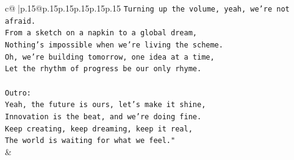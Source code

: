 \documentclass{article}
\begin{document}
{\begin{supertabular}{c@{$\;$}|p{.15\linewidth}@{}p{.15\linewidth}p{.15\linewidth}p{.15\linewidth}p{.15\linewidth}p{.15\linewidth}}
{{{\texttt{Turning up the volume, yeah, we're not afraid.} \\
\texttt{From a sketch on a napkin to a global dream,} \\
\texttt{Nothing's impossible when we're living the scheme.} \\
\texttt{Oh, we're building tomorrow, one idea at a time,} \\
\texttt{Let the rhythm of progress be our only rhyme.} \\
\\ 
\texttt{Outro:} \\
\texttt{Yeah, the future is ours, let's make it shine,} \\
\texttt{Innovation is the beat, and we're doing fine.} \\
\texttt{Keep creating, keep dreaming, keep it real,} \\
\texttt{The world is waiting for what we feel."} \\
            }
        }
    }
    & \\ \\


\end{supertabular}}
\end{document}
